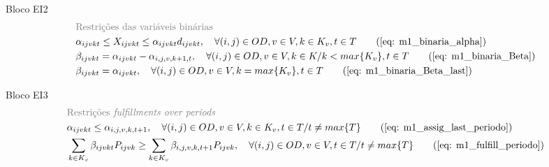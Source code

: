 \vspace{1cm}
\begin{bloque2}{Bloco \hypertarget{frase:EI2.1}{EI2} }
\allowdisplaybreaks
\begin{align}
	 & \textcolor{gray}{\text{Restrições das variáveis binárias}} \notag   \\ 
	 & \alpha_{ijvkt} \leq X_{ijvkt} \leq \alpha_{ijvkt}d_{ijvkt}, \quad   \forall(i,j) \in OD, v \in V, k \in K_v, t \in T   \tag{\ref{eq: m1_binaria_alpha}}                                                                    \\
	 & \beta_{ijvkt} = \alpha_{ijvkt} - \alpha_{i,j,v,k+1,t}, \quad \forall (i,j) \in OD, v \in V, k \in K /k < max\{K_v\}, t\in T    \tag{\ref{eq: m1_binaria_Beta}}                                                             \\
	 & \beta_{ijvkt} = \alpha_{ijvkt}, \quad   \forall(i,j) \in OD, v \in V, k = max\{K_v\}, t \in T    \tag{\ref{eq: m1_binaria_Beta_last}}                                                                                      
\end{align}
\end{bloque2}



\begin{bloque3}{Bloco \hypertarget{frase:EI3.1}{EI3} }
\allowdisplaybreaks
\begin{align}
	& \textcolor{gray}{\text{Restrições \textit{fulfillments over periods}}} \notag   \\
	& \alpha_{ijvkt} \leq \alpha_{i,j,v,k,t+1}, \quad   \forall(i,j) \in OD, v \in V, k \in K_v, t \in T/ t \neq max\{T\}     \tag{\ref{eq: m1_assig_last_periodo}}                                                              \\
	& \sum_{k \in K_v}\beta_{ijvkt}P_{ijvk} \geq \sum_{k \in K_v}\beta_{i,j,v,k,t+1}P_{ijvk},  \quad   \forall(i,j) \in OD, v \in V, t \in T/ t \neq max\{T\}   \tag{\ref{eq: m1_fulfill_periodo}}                         
\end{align}
\end{bloque3} 


